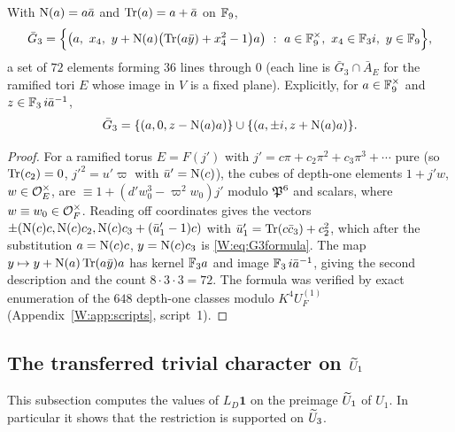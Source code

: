\begin{proposition}\label{W:prop:G3explicit}
With $\operatorname N(a)=a\bar a$ and $\operatorname{Tr}(a)=a+\bar a$ on $\mathbb F_9$,
\begin{equation}\label{W:eq:G3formula}
 \bar G_3=\Bigl\{\bigl(a,\ x_4,\ y+\operatorname N(a)\bigl(\operatorname{Tr}(a\bar y)+x_4^2-1\bigr)a\bigr)
 \ :\ a\in\mathbb F_9^\times,\ x_4\in\mathbb F_3 i,\ y\in\mathbb F_9\Bigr\},
\end{equation}
a set of $72$ elements forming $36$ lines through $0$ (each line is
$\bar G_3\cap\bar A_E$ for the ramified tori $E$ whose image in $V$ is
a fixed plane).  Explicitly, for $a\in\mathbb F_9^\times$ and $z\in\mathbb F_3\,i\bar a^{-1}$,
\[
 \bar G_3=\{(a,0,z-\operatorname N(a)a)\}\cup\{(a,\pm i,z+\operatorname N(a)a)\}.
\]
\end{proposition}
\begin{proof}
For a ramified torus $E=F(j')$ with $j'=c\pi+c_2\pi^2+c_3\pi^3+\cdots$
pure (so $\operatorname{Tr}(c_2)=0$, $j'^2=u'\varpi$ with $\bar u'=\operatorname N(c)$), the cubes
of depth-one elements $1+j'w$, $w\in\mathcal O_E^\times$, are
$\equiv1+(d'w_0^3-\varpi^2w_0)j'$ modulo $\mathfrak P^6$ and scalars, where
$w\equiv w_0\in\mathcal O_F^\times$.  Reading off coordinates gives the
vectors $\pm(\operatorname N(c)c,\operatorname N(c)c_2,\operatorname N(c)c_3+(\bar u_1'-1)c)$ with
$\bar u_1'=\operatorname{Tr}(c\bar c_3)+c_2^2$, which after the substitution
$a=\operatorname N(c)c$, $y=\operatorname N(c)c_3$ is \eqref{W:eq:G3formula}.  The map
$y\mapsto y+\operatorname N(a)\operatorname{Tr}(a\bar y)a$ has kernel $\mathbb F_3a$ and image
$\mathbb F_3\,i\bar a^{-1}$, giving the second description and the count
$8\cdot3\cdot3=72$.  The formula was verified by exact enumeration
of the $648$ depth-one classes modulo $K^4U_F^{(1)}$
(Appendix~\ref{W:app:scripts}, script~1).
\end{proof}

\subsection{The transferred trivial character on $\widetilde U_1$}
This subsection computes the values of $L_D\mathbf1$ on the preimage $\widetilde U_1$ of $U_1$. In particular it shows that the restriction is supported on $\widetilde U_3$.

